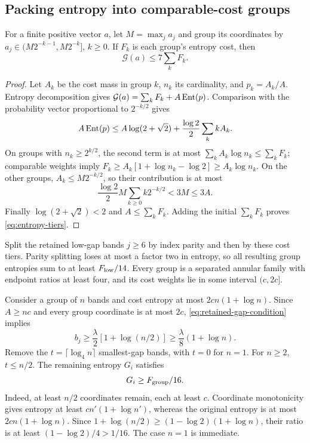 \subsection{Packing entropy into comparable-cost groups}

\begin{lemma}\label{lem:entropy-tiers}
For a finite positive vector $a$, let $M=\max_j a_j$ and group its
coordinates by $a_j\in(M2^{-k-1},M2^{-k}]$, $k\ge0$.
If $F_k$ is each group's entropy cost, then
\begin{equation}\label{eq:entropy-tiers}
 \mathcal G(a)\le7\sum_k F_k.
\end{equation}
\end{lemma}

\begin{proof}
Let $A_k$ be the cost mass in group $k$, $n_k$ its cardinality, and
$p_k=A_k/A$. Entropy decomposition gives
$\mathcal G(a)=\sum_kF_k+A\operatorname{Ent}(p)$.
Comparison with the probability vector proportional to $2^{-k/2}$ gives
\[
 A\operatorname{Ent}(p)\le A\log(2+\sqrt2)
                 +\frac{\log2}{2}\sum_k kA_k.
\]
On groups with $n_k\ge2^{k/2}$, the second term is at most
$\sum_kA_k\log n_k\le\sum_kF_k$; comparable weights imply
$F_k\ge A_k[1+\log n_k-\log2]\ge A_k\log n_k$.
On the other groups, $A_k\le M2^{-k/2}$, so their contribution is at most
\[
 \frac{\log2}{2}M\sum_{k\ge0}k2^{-k/2}<3M\le3A.
 \]
Finally $\log(2+\sqrt2)<2$ and $A\le\sum_kF_k$.
Adding the initial $\sum_kF_k$ proves \eqref{eq:entropy-tiers}.
\end{proof}

Split the retained low-gap bands $j\ge6$ by index parity and then by
these cost tiers. Parity splitting loses at most a factor two in
entropy, so all resulting group entropies sum to at least $F_{\rm low}/14$.
Every group is a separated annular family with endpoint ratios at least
four, and its cost weights lie in some interval $(c,2c]$.

Consider a group of $n$ bands and cost entropy at most $2cn(1+\log n)$.
Since $A\ge nc$ and every group coordinate is at most $2c$,
\eqref{eq:retained-gap-condition} implies
\[
 b_j\ge\frac{\lambda}{2}[1+\log(n/2)]
       \ge\frac{\lambda}{8}(1+\log n).
\]
Remove the $t=\lceil\log_4n\rceil$ smallest-gap bands, with $t=0$ for
$n=1$. For $n\ge2$, $t\le n/2$. The remaining entropy $G_i$ satisfies
\begin{equation}\label{eq:trimmed-entropy}
 G_i\ge F_{\rm group}/16.
\end{equation}
Indeed, at least $n/2$ coordinates remain, each at least $c$.
Coordinate monotonicity gives entropy at least
$cn'(1+\log n')$, whereas the original entropy is at most
$2cn(1+\log n)$. Since
$1+\log(n/2)\ge(1-\log2)(1+\log n)$, their ratio is at least
$(1-\log2)/4>1/16$. The case $n=1$ is immediate.

